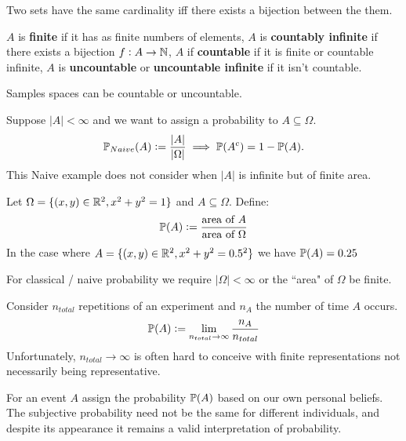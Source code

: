 \begin{definition}
    Two sets have the same cardinality iff there exists a bijection between the them.
\end{definition}

\begin{definition}
    $A$ is \textbf{finite} if it has as finite numbers of elements, $A$ is \textbf{countably infinite} if there exists a bijection $f: A \to \mathbb{N}$, $A$ if \textbf{countable} if it is finite or countable infinite, $A$ is \textbf{uncountable} or \textbf{uncountable infinite} if it isn't countable.
\end{definition}

Samples spaces can be countable or uncountable.

\begin{definition}
    Suppose $|A| < \infty$ and we want to assign a probability to $A \subseteq \Omega$.
    \[
    \mathbb{P}_{Naive}(A) := \frac{|A|}{|\Omega|} \implies \mathbb{P}(A^c) = 1 - \mathbb{P}(A)  \textcolor{black}{.}
    \]
    This Naive example does not consider when $|A|$ is infinite but of finite area.
\end{definition}
\begin{example}
    Let $\Omega = \{(x,y) \in \mathbb{R}^2, x^2+y^2=1\}$ and $A\subseteq\Omega$. Define: 
    \[
    \mathbb{P}(A) := \frac{\text{area of } A}{\text{area of } \Omega}
    \]
    In the case where $A = \{(x,y) \in \mathbb{R}^2, x^2+y^2=0.5^2\}$ we have $\mathbb{P}(A) = 0.25$
\end{example}
\begin{remark}
    For classical / naive probability we require $|\Omega| < \infty$ or the ``area" of $\Omega$ be finite. 
\end{remark}

\begin{definition}
    Consider $n_{total}$ repetitions of an experiment and $n_A$ the number of time $A$ occurs.
    \[\mathbb{P}(A) := \lim_{n_{total} \to \infty} \frac{n_A}{n_{total}}\]
    Unfortunately, $n_{total} \to \infty$ is often hard to conceive with finite representations not necessarily being representative.
\end{definition}

\begin{definition}
    For an event $A$ assign the probability $\mathbb{P}(A)$ based on our own personal beliefs. The subjective probability need not be the same for different individuals, and despite its appearance it remains a valid interpretation of probability.
\end{definition}

